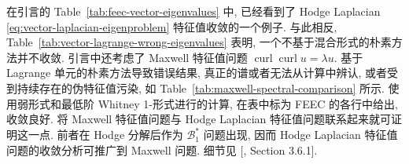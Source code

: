 {在引言的 Table~\ref{tab:feec-vector-eigenvalues} 中, 已经看到了 Hodge Laplacian \eqref{eq:vector-laplacian-eigenproblem} 特征值收敛的一个例子. 与此相反, Table~\ref{tab:vector-lagrange-wrong-eigenvalues} 表明, 一个不基于混合形式的朴素方法并不收敛. 引言中还考虑了 Maxwell 特征值问题 $\operatorname{curl}\operatorname{curl}u=\lambda u$. 基于 Lagrange 单元的朴素方法导致错误结果, 真正的谱或者无法从计算中辨认, 或者受到持续存在的伪特征值污染, 如 Table~\ref{tab:maxwell-spectral-comparison} 所示. 使用弱形式和最低阶 Whitney 1-形式进行的计算, 在表中标为 FEEC 的各行中给出, 收敛良好. 将 Maxwell 特征值问题与 Hodge Laplacian 特征值问题联系起来就可证明这一点. 前者在 Hodge 分解后作为 $\mathcal B_1^*$ 问题出现, 因而 Hodge Laplacian 特征值问题的收敛分析可推广到 Maxwell 问题. 细节见 [, Section 3.6.1].}
